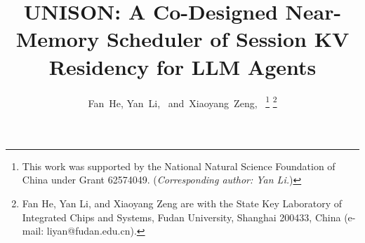 \documentclass[journal]{IEEEtran}
\title{UNISON: A Co-Designed Near-Memory Scheduler of Session KV Residency for LLM Agents}
\author{Fan~He,
        Yan~Li,~\IEEEmembership{Member,~IEEE,}
        and~Xiaoyang~Zeng,~\IEEEmembership{Senior~Member,~IEEE}%
\thanks{This work was supported by the National Natural Science Foundation of China under Grant 62574049. (\textit{Corresponding author: Yan Li.})}%
\thanks{Fan He, Yan Li, and Xiaoyang Zeng are with the State Key Laboratory of Integrated Chips and Systems, Fudan University, Shanghai 200433, China (e-mail: liyan@fudan.edu.cn).}%
}
\begin{document}
\maketitle



\IEEEpeerreviewmaketitle











\end{document}
